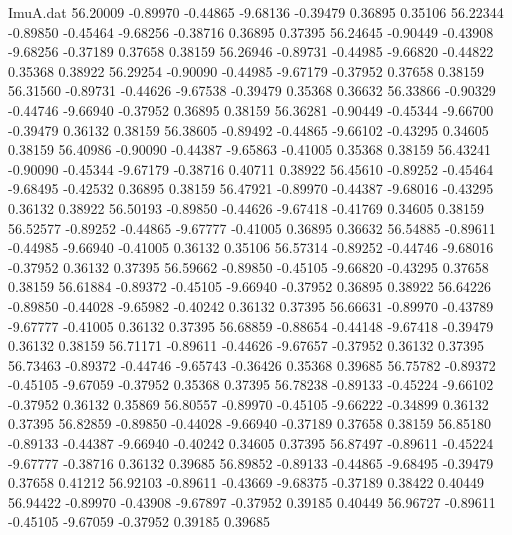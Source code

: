 \begin{filecontents}{ImuA.dat}
  56.20009   -0.89970   -0.44865   -9.68136   -0.39479    0.36895    0.35106
  56.22344   -0.89850   -0.45464   -9.68256   -0.38716    0.36895    0.37395
  56.24645   -0.90449   -0.43908   -9.68256   -0.37189    0.37658    0.38159
  56.26946   -0.89731   -0.44985   -9.66820   -0.44822    0.35368    0.38922
  56.29254   -0.90090   -0.44985   -9.67179   -0.37952    0.37658    0.38159
  56.31560   -0.89731   -0.44626   -9.67538   -0.39479    0.35368    0.36632
  56.33866   -0.90329   -0.44746   -9.66940   -0.37952    0.36895    0.38159
  56.36281   -0.90449   -0.45344   -9.66700   -0.39479    0.36132    0.38159
  56.38605   -0.89492   -0.44865   -9.66102   -0.43295    0.34605    0.38159
  56.40986   -0.90090   -0.44387   -9.65863   -0.41005    0.35368    0.38159
  56.43241   -0.90090   -0.45344   -9.67179   -0.38716    0.40711    0.38922
  56.45610   -0.89252   -0.45464   -9.68495   -0.42532    0.36895    0.38159
  56.47921   -0.89970   -0.44387   -9.68016   -0.43295    0.36132    0.38922
  56.50193   -0.89850   -0.44626   -9.67418   -0.41769    0.34605    0.38159
  56.52577   -0.89252   -0.44865   -9.67777   -0.41005    0.36895    0.36632
  56.54885   -0.89611   -0.44985   -9.66940   -0.41005    0.36132    0.35106
  56.57314   -0.89252   -0.44746   -9.68016   -0.37952    0.36132    0.37395
  56.59662   -0.89850   -0.45105   -9.66820   -0.43295    0.37658    0.38159
  56.61884   -0.89372   -0.45105   -9.66940   -0.37952    0.36895    0.38922
  56.64226   -0.89850   -0.44028   -9.65982   -0.40242    0.36132    0.37395
  56.66631   -0.89970   -0.43789   -9.67777   -0.41005    0.36132    0.37395
  56.68859   -0.88654   -0.44148   -9.67418   -0.39479    0.36132    0.38159
  56.71171   -0.89611   -0.44626   -9.67657   -0.37952    0.36132    0.37395
  56.73463   -0.89372   -0.44746   -9.65743   -0.36426    0.35368    0.39685
  56.75782   -0.89372   -0.45105   -9.67059   -0.37952    0.35368    0.37395
  56.78238   -0.89133   -0.45224   -9.66102   -0.37952    0.36132    0.35869
  56.80557   -0.89970   -0.45105   -9.66222   -0.34899    0.36132    0.37395
  56.82859   -0.89850   -0.44028   -9.66940   -0.37189    0.37658    0.38159
  56.85180   -0.89133   -0.44387   -9.66940   -0.40242    0.34605    0.37395
  56.87497   -0.89611   -0.45224   -9.67777   -0.38716    0.36132    0.39685
  56.89852   -0.89133   -0.44865   -9.68495   -0.39479    0.37658    0.41212
  56.92103   -0.89611   -0.43669   -9.68375   -0.37189    0.38422    0.40449
  56.94422   -0.89970   -0.43908   -9.67897   -0.37952    0.39185    0.40449
  56.96727   -0.89611   -0.45105   -9.67059   -0.37952    0.39185    0.39685

\end{filecontents}
